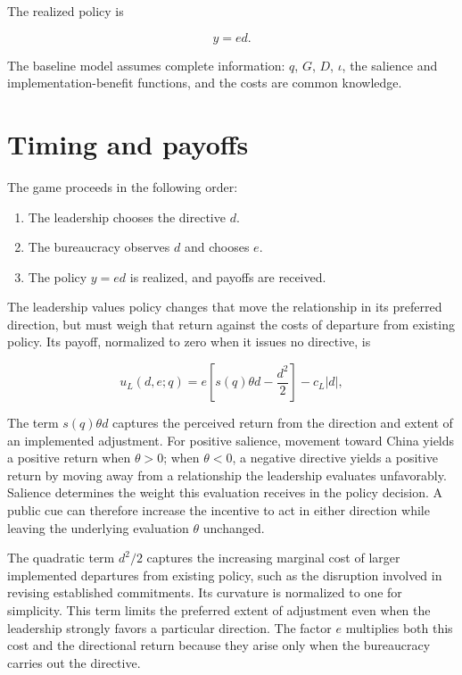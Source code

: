 \documentclass[
  11pt,
]{article}
\providecommand{\tightlist}{%
  \setlength{\itemsep}{0pt}\setlength{\parskip}{0pt}}
\theoremstyle{definition}
\begin{document}
The realized policy is

\[
y=ed.
\]

The baseline model assumes complete information: \(q\), \(G\), \(D\),
\(\iota\), the salience and implementation-benefit functions, and the
costs are common knowledge.

\section{Timing and payoffs}\label{timing-and-payoffs}

The game proceeds in the following order:

\begin{enumerate}
\def\labelenumi{\arabic{enumi}.}
\tightlist
\item
  The leadership chooses the directive \(d\).
\item
  The bureaucracy observes \(d\) and chooses \(e\).
\item
  The policy \(y=ed\) is realized, and payoffs are received.
\end{enumerate}

The leadership values policy changes that move the relationship in its
preferred direction, but must weigh that return against the costs of
departure from existing policy. Its payoff, normalized to zero when it
issues no directive, is

\[
u_L(d,e;q)
=
e\left[s(q)\theta d-\frac{d^2}{2}\right]
-c_L|d|,
\tag{1}
\]

The term \(s(q)\theta d\) captures the perceived return from the
direction and extent of an implemented adjustment. For positive
salience, movement toward China yields a positive return when
\(\theta>0\); when \(\theta<0\), a negative directive yields a positive
return by moving away from a relationship the leadership evaluates
unfavorably. Salience determines the weight this evaluation receives in
the policy decision. A public cue can therefore increase the incentive
to act in either direction while leaving the underlying evaluation
\(\theta\) unchanged.

The quadratic term \(d^2/2\) captures the increasing marginal cost of
larger implemented departures from existing policy, such as the
disruption involved in revising established commitments. Its curvature
is normalized to one for simplicity. This term limits the preferred
extent of adjustment even when the leadership strongly favors a
particular direction. The factor \(e\) multiplies both this cost and the
directional return because they arise only when the bureaucracy carries
out the directive.
\end{document}
